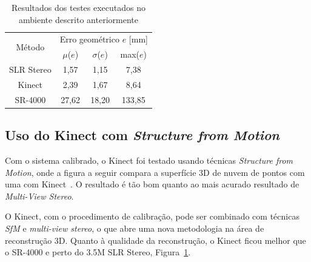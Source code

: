 \begin{table}[htbp]
\caption{Resultados dos testes executados no ambiente descrito anteriormente}
\label{tab:resultadosKinect}
\begin{center}
\begin{tabular}{|c|c|c|c|}
\hline
\multirow{2}{1.5cm}{Método}& \multicolumn{3}{p{5cm}|}{Erro geométrico $e$ [mm]} \bigstrut \\
\cline{2-4} & \multicolumn{1}{c|}{$\mu$($e$)} & \multicolumn{1}{c|}{$\sigma$($e$)} & \multicolumn{1}{c|}{max($e$)} \bigstrut \\ \hline
SLR Stereo & 1,57 & 1,15 & 7,38 \bigstrut \\ \hline
Kinect & 2,39 & 1,67 & 8,64 \bigstrut \\ \hline
SR-4000 & 27,62 & 18,20 & 133,85 \bigstrut \\ 
\hline
\end{tabular}
\end{center}
\end{table}

\subsection*{Uso do Kinect com \emph{Structure from Motion}}

Com o sistema calibrado, o Kinect foi testado usando técnicas \emph{Structure
from Motion}, onde a figura a seguir compara a superfície 3D de nuvem de pontos
com uma com Kinect~\cite{smisek20133d}.  O resultado é tão bom quanto ao mais
acurado resultado de \emph{Multi-View Stereo}.

O Kinect, com o procedimento de calibração, pode ser combinado
com técnicas \emph{SfM} e \emph{multi-view stereo}, o que abre uma
nova metodologia na área de reconstrução 3D.
Quanto à qualidade da reconstrução, o Kinect ficou melhor que o
SR-4000 e perto do 3.5M SLR Stereo, Figura~\ref{tab:resultadosKinect}.



